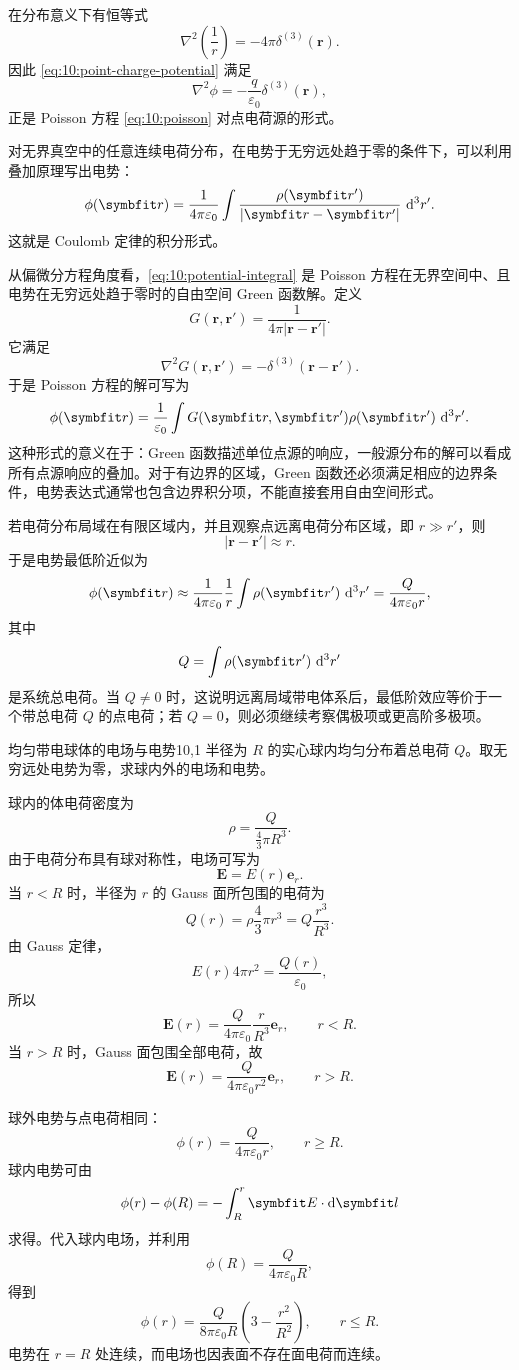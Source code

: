 在分布意义下有恒等式
\[
\nabla^{2}\left(\frac{1}{r}\right)
=
-4\pi\delta^{(3)}(\bm{r}).
\]
因此 \eqref{eq:10:point-charge-potential} 满足
\[
\nabla^{2}\phi
=
-\frac{q}{\varepsilon_{0}}\delta^{(3)}(\bm{r}),
\]
正是 Poisson 方程 \eqref{eq:10:poisson} 对点电荷源的形式。

对无界真空中的任意连续电荷分布，在电势于无穷远处趋于零的条件下，可以利用叠加原理写出电势：
\begin{equation}
	\phi(\bm{r})
	=
	\frac{1}{4\pi\varepsilon_{0}}
	\int
	\frac{\rho(\bm{r}')}{|\bm{r}-\bm{r}'|}
	\,\dif^{3}r'.
	\label{eq:10:potential-integral}
\end{equation}
这就是 Coulomb 定律的积分形式。

从偏微分方程角度看，\eqref{eq:10:potential-integral} 是 Poisson 方程在无界空间中、且电势在无穷远处趋于零时的自由空间 Green 函数解。定义
\[
G(\bm{r},\bm{r}')
=
\frac{1}{4\pi|\bm{r}-\bm{r}'|}.
\]
它满足
\[
\nabla^{2}G(\bm{r},\bm{r}')
=
-\delta^{(3)}(\bm{r}-\bm{r}').
\]
于是 Poisson 方程的解可写为
\[
\phi(\bm{r})
=
\frac{1}{\varepsilon_{0}}
\int
G(\bm{r},\bm{r}')\rho(\bm{r}')
\,\dif^{3}r'.
\]
这种形式的意义在于：Green 函数描述单位点源的响应，一般源分布的解可以看成所有点源响应的叠加。对于有边界的区域，Green 函数还必须满足相应的边界条件，电势表达式通常也包含边界积分项，不能直接套用自由空间形式。

若电荷分布局域在有限区域内，并且观察点远离电荷分布区域，即 $r\gg r'$，则
\[
|\bm{r}-\bm{r}'|
\approx r.
\]
于是电势最低阶近似为
\[
\phi(\bm{r})
\approx
\frac{1}{4\pi\varepsilon_{0}}
\frac{1}{r}
\int \rho(\bm{r}')\,\dif^{3}r'
=
\frac{Q}{4\pi\varepsilon_{0}r},
\]
其中
\[
Q
=
\int \rho(\bm{r}')\,\dif^{3}r'
\]
是系统总电荷。当 $Q\neq 0$ 时，这说明远离局域带电体系后，最低阶效应等价于一个带总电荷 $Q$ 的点电荷；若 $Q=0$，则必须继续考察偶极项或更高阶多极项。

\begin{example}{均匀带电球体的电场与电势}{10,1}
半径为 $R$ 的实心球内均匀分布着总电荷 $Q$。取无穷远处电势为零，求球内外的电场和电势。

\begin{solution}
球内的体电荷密度为
\[
\rho
=
\frac{Q}{\frac{4}{3}\pi R^{3}}.
\]
由于电荷分布具有球对称性，电场可写为
\[
\bm{E}=E(r)\bm{e}_{r}.
\]
当 $r<R$ 时，半径为 $r$ 的 Gauss 面所包围的电荷为
\[
Q(r)
=
\rho\frac{4}{3}\pi r^{3}
=
Q\frac{r^{3}}{R^{3}}.
\]
由 Gauss 定律，
\[
E(r)4\pi r^{2}
=
\frac{Q(r)}{\varepsilon_{0}},
\]
所以
\[
\bm{E}(r)
=
\frac{Q}{4\pi\varepsilon_{0}}
\frac{r}{R^{3}}\bm{e}_{r},
\qquad r<R.
\]
当 $r>R$ 时，Gauss 面包围全部电荷，故
\[
\bm{E}(r)
=
\frac{Q}{4\pi\varepsilon_{0}r^{2}}\bm{e}_{r},
\qquad r>R.
\]

球外电势与点电荷相同：
\[
\phi(r)
=
\frac{Q}{4\pi\varepsilon_{0}r},
\qquad r\geq R.
\]
球内电势可由
\[
\phi(r)-\phi(R)
=
-\int_{R}^{r}\bm{E}\cdot\dif\bm{l}
\]
求得。代入球内电场，并利用
\[
\phi(R)=\frac{Q}{4\pi\varepsilon_{0}R},
\]
得到
\[
\phi(r)
=
\frac{Q}{8\pi\varepsilon_{0}R}
\left(
3-\frac{r^{2}}{R^{2}}
\right),
\qquad r\leq R.
\]
电势在 $r=R$ 处连续，而电场也因表面不存在面电荷而连续。
\end{solution}
\end{example}



